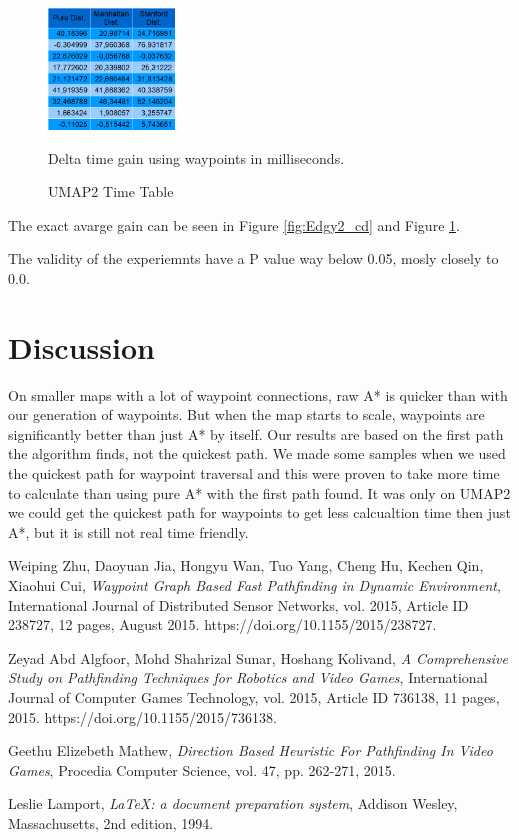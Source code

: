 \documentclass[a4paper]{article}
\begin{document}
\begin{figure}[h!]
\centering
\includegraphics[width=0.3\textwidth,height=\textheight,keepaspectratio]{ChartsAndFigures/UMAP2_timeTable.png}
\caption{UMAP2 Time Table}
Delta time gain using waypoints in milliseconds.
\label{fig:UMAP2_cd}
\end{figure}

The exact avarge gain can be seen in Figure \ref{fig:Edgy2_cd} and Figure \ref{fig:UMAP2_cd}.
	
The validity of the experiemnts have a P value way below 0.05, mosly closely to 0.0.

\section{Discussion}
On smaller maps with a lot of waypoint connections, raw A* is quicker than with our generation of waypoints. But when the map starts to scale, waypoints are significantly better than just A* by itself.
Our results are based on the first path the algorithm finds, not the quickest path. We made some samples when we used the quickest path for waypoint traversal and this were proven to take more time to calculate than using pure A* with the first path found.
It was only on UMAP2 we could get the quickest path for waypoints to get less calcualtion time then just A*, but it is still not real time friendly.

\newpage
\begin{thebibliography}{9}

  Weiping Zhu, Daoyuan Jia, Hongyu Wan, Tuo Yang, Cheng Hu, Kechen Qin, Xiaohui Cui,
  \textit{Waypoint Graph Based Fast Pathfinding in Dynamic Environment},
  International Journal of Distributed Sensor Networks, vol. 2015, Article ID 238727, 12 pages,
  August 2015. https://doi.org/10.1155/2015/238727.

  Zeyad Abd Algfoor, Mohd Shahrizal Sunar, Hoshang Kolivand,
  \textit{A Comprehensive Study on Pathfinding Techniques for Robotics and Video Games},
  International Journal of Computer Games Technology, vol. 2015, Article ID 736138, 11 pages,
  2015. https://doi.org/10.1155/2015/736138.

  Geethu Elizebeth Mathew,
  \textit{Direction Based Heuristic For Pathfinding In Video Games},
  Procedia Computer Science, vol. 47, pp. 262-271,
  2015.

  Leslie Lamport,
  \textit{\LaTeX: a document preparation system},
  Addison Wesley, Massachusetts,
  2nd edition,
  1994.

\end{thebibliography}
\end{document}
